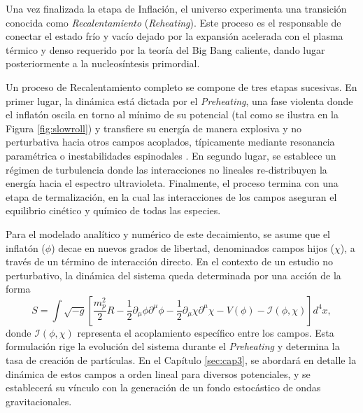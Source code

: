 Una vez finalizada la etapa de Inflación, el universo experimenta una transición conocida como \textit{Recalentamiento} (\textit{Reheating}). Este proceso es el responsable de conectar el estado frío y vacío dejado por la expansión acelerada con el plasma térmico y denso requerido por la teoría del Big Bang caliente, dando lugar posteriormente a la nucleosíntesis primordial. 

Un proceso de Recalentamiento completo se compone de tres etapas sucesivas. En primer lugar, la dinámica está dictada por el \textit{Preheating}, una fase violenta donde el inflatón oscila en torno al mínimo de su potencial (tal como se ilustra en la Figura \ref{fig:slowroll}) y transfiere su energía de manera explosiva y no perturbativa hacia otros campos acoplados, típicamente mediante resonancia paramétrica o inestabilidades espinodales \cite{Amin_2014, Kofman_1994, Kofman_1997}. En segundo lugar, se establece un régimen de turbulencia donde las interacciones no lineales re-distribuyen la energía hacia el espectro ultravioleta. Finalmente, el proceso termina con una etapa de termalización, en la cual las interacciones de los campos aseguran el equilibrio cinético y químico de todas las especies.

Para el modelado analítico y numérico de este decaimiento, se asume que el inflatón ($\phi$) decae en nuevos grados de libertad, denominados campos hijos ($\chi$), a través de un término de interacción directo. En el contexto de un estudio no perturbativo, la dinámica del sistema queda determinada por una acción de la forma
\begin{equation}
    S = \int \sqrt{-g} \left[ \frac{m_p^2}{2} R - \frac{1}{2} \partial_\mu \phi \partial^\mu \phi - \frac{1}{2} \partial_\mu \chi \partial^\mu \chi - V(\phi) - \mathcal{I} (\phi, \chi)  \right] d^4 x,
\end{equation}
donde $\mathcal{I} (\phi, \chi)$ representa el acoplamiento específico entre los campos. Esta formulación rige la evolución del sistema durante el \textit{Preheating} y determina la tasa de creación de partículas. En el Capítulo \ref{sec:cap3}, se abordará en detalle la dinámica de estos campos a orden lineal para diversos potenciales, y se establecerá su vínculo con la generación de un fondo estocástico de ondas gravitacionales.

